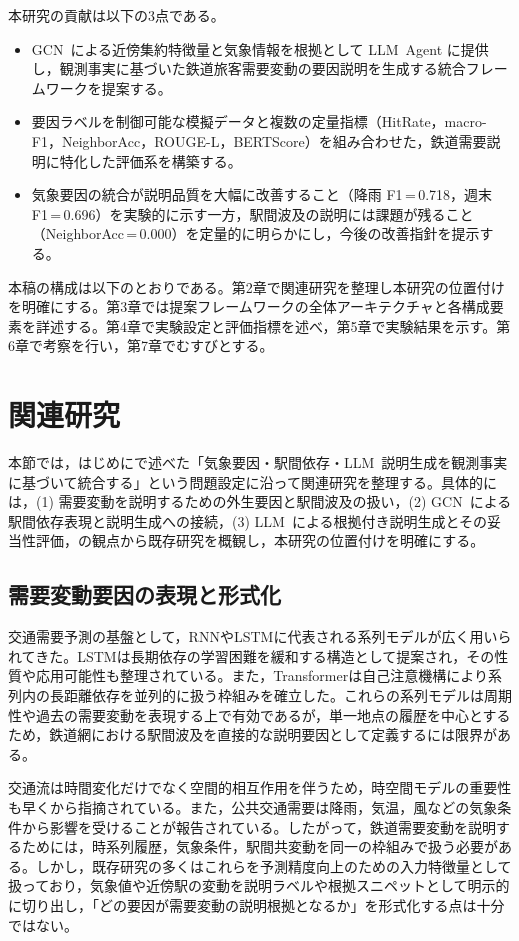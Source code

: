 \documentclass[technicalreport]{ieicej}
\newcommand{\LLM}{LLM}
\newcommand{\GCN}{GCN}
\begin{document}
本研究の貢献は以下の3点である。
\begin{itemize}
  \item \GCN\ による近傍集約特徴量と気象情報を根拠として \LLM\ Agent に提供し，観測事実に基づいた鉄道旅客需要変動の要因説明を生成する統合フレームワークを提案する。
  \item 要因ラベルを制御可能な模擬データと複数の定量指標（HitRate，macro-F1，NeighborAcc，ROUGE-L，BERTScore）を組み合わせた，鉄道需要説明に特化した評価系を構築する。
  \item 気象要因の統合が説明品質を大幅に改善すること（降雨 F1\,=\,0.718，週末 F1\,=\,0.696）を実験的に示す一方，駅間波及の説明には課題が残ること（NeighborAcc\,=\,0.000）を定量的に明らかにし，今後の改善指針を提示する。
\end{itemize}

本稿の構成は以下のとおりである。第2章で関連研究を整理し本研究の位置付けを明確にする。第3章では提案フレームワークの全体アーキテクチャと各構成要素を詳述する。第4章で実験設定と評価指標を述べ，第5章で実験結果を示す。第6章で考察を行い，第7章でむすびとする。

\section{関連研究}
本節では，はじめにで述べた「気象要因・駅間依存・\LLM\ 説明生成を観測事実に基づいて統合する」という問題設定に沿って関連研究を整理する。具体的には，(1) 需要変動を説明するための外生要因と駅間波及の扱い，(2) \GCN\ による駅間依存表現と説明生成への接続，(3) \LLM\ による根拠付き説明生成とその妥当性評価，の観点から既存研究を概観し，本研究の位置付けを明確にする。

\subsection{需要変動要因の表現と形式化}
交通需要予測の基盤として，RNNやLSTMに代表される系列モデルが広く用いられてきた。LSTMは長期依存の学習困難を緩和する構造として提案され\cite{7508408}，その性質や応用可能性も整理されている\cite{sherstinsky2020fundamentals,yu2019review}。また，Transformerは自己注意機構により系列内の長距離依存を並列的に扱う枠組みを確立した\cite{vaswani2017attention}。これらの系列モデルは周期性や過去の需要変動を表現する上で有効であるが，単一地点の履歴を中心とするため，鉄道網における駅間波及を直接的な説明要因として定義するには限界がある。

交通流は時間変化だけでなく空間的相互作用を伴うため，時空間モデルの重要性も早くから指摘されている\cite{kamarianakis2005space}。また，公共交通需要は降雨，気温，風などの気象条件から影響を受けることが報告されている\cite{zhou2017impacts}。したがって，鉄道需要変動を説明するためには，時系列履歴，気象条件，駅間共変動を同一の枠組みで扱う必要がある。しかし，既存研究の多くはこれらを予測精度向上のための入力特徴量として扱っており，気象値や近傍駅の変動を説明ラベルや根拠スニペットとして明示的に切り出し，「どの要因が需要変動の説明根拠となるか」を形式化する点は十分ではない。
\end{document}
